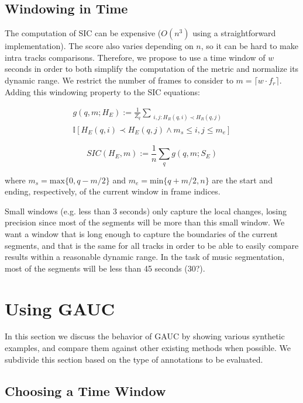 \documentclass{article}
\begin{document}
\subsection{Windowing in Time}

The computation of SIC can be expensive ($O(n^3)$ using a straightforward implementation).
The score also varies depending on $n$, so it can be hard to make intra tracks comparisons.
Therefore, we propose to use a time window of $w$ seconds in order to both simplify the computation of the metric and normalize its dynamic range.
We restrict the number of frames to consider to $m = \lceil w \cdot f_r \rceil$.
Adding this windowing property to the SIC equations:

\begin{multline}
  g(q, m ; H_E) := \frac{1}{Z_q} \sum_{\substack{i,j : H_R(q, i) \prec H_R(q, j) }} \\ \mathbb{I}\left[ H_E(q, i) \prec H_E(q, j) \land m_s \leq i,j \leq m_e\right]
\end{multline}

\begin{equation}
SIC(H_E,m) := \frac{1}{n} \sum_q g(q,m ; S_E)
\end{equation}

where $m_s = \mbox{max}\{0,q-m/2\}$ and $m_e = \mbox{min}\{q+m/2,n\}$ are the start and ending, respectively, of the current window in frame indices.

Small windows (e.g. less than 3 seconds) only capture the local changes, losing precision since most of the segments will be more than this small window.
We want a window that is long enough to capture the boundaries of the current segments, and that is the same for all tracks in order to be able to easily compare results within a reasonable dynamic range.
In the task of music segmentation, most of the segments will be less than 45 seconds (30?).

\section{Using GAUC}\label{sec:using_method}

In this section we discuss the behavior of GAUC by showing various synthetic examples, and compare them against other existing methods when possible.
We subdivide this section based on the type of annotations to be evaluated.

\subsection{Choosing a Time Window}
\end{document}
